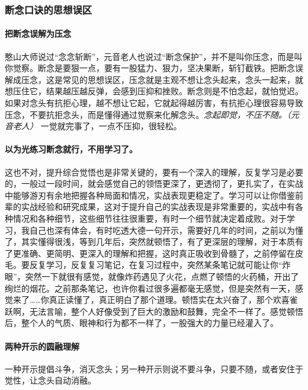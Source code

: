 \subsubsection{断念口诀的思想误区}

\paragraph{把断念误解为压念}

憨山大师说过“念念斩断”，元音老人也说过“断念保护”，并不是叫你压念，而是叫你觉察。断念是要狠一点，要有一股猛力、狠力，坚决果断，斩钉截铁。把断念误解成压念，这是常见的思想误区，压念就是主观不想让念头起来，念头一起来，就想压住它，结果越压越反弹，会感到压抑和挫败。断念则是不怕念起，就怕觉迟。如果对念头有抗拒心理，越不想让它起，它就起得越厉害，有抗拒心理很容易导致压念，不要抗拒念头，而是懂得通过觉察来化解念头。\textit{念起即觉，不压不随。（元音老人）} 一觉就完事了，一点不压抑，很轻松。

\paragraph{以为光练习断念就行，不用学习了。}

这也不对，提升综合觉悟也是非常关键的，要有一个深入的理解，反复学习是必要的，一般过一段时间，就会感觉自己的领悟更深了，更透彻了，更扎实了，在实战中能够游刃有余地把握各种局面和情况，实战表现更稳定了。学习可以让你借鉴前辈的实战经验和研究成果，这对于提升自己的实战表现是非常重要的，实战中有各种情况和各种细节，这些细节往往很重要，有时一个细节就决定着成败。对于学习，我自己也深有体会，有时吃透大德一句开示，需要好几年的时间，之前以为懂了，其实懂得很浅，等到几年后，突然就顿悟了，有了更深层的理解，对于本质有了更准确、更简明、更深入的理解和把握，这时真正吸收到骨髓了，之前停留在皮毛。要反复学习，反复复习笔记，在复习过程中，突然某条笔记就可能让你“炸眼”，突然一下就很有感觉，就像炸药遇见了火花，点燃了顿悟的火药桶，开出了绚烂的烟花。之前那条笔记，也许你看过很多遍都毫无感觉，但是突然有一天，感觉来了……你真正读懂了，真正明白了那个道理。顿悟实在太兴奋了，那个欢喜雀跃啊，无法言喻，整个人好像受到了巨大的激励和鼓舞，完全不一样了。感觉顿悟后，整个人的气质、眼神和行为都不一样了，一股强大的力量已经灌入了。

\paragraph{两种开示的圆融理解}

一种开示提倡斗争，消灭念头；另一种开示则说不要斗争，只要不随，或者安住于觉性，让念头自动消融。

